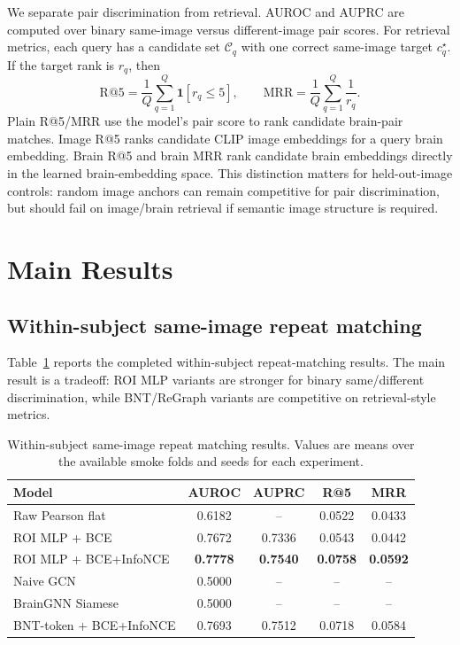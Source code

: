 \documentclass{article}
\begin{document}
We separate pair discrimination from retrieval. AUROC and AUPRC are computed over binary same-image versus different-image pair scores. For retrieval metrics, each query has a candidate set $\mathcal{C}_q$ with one correct same-image target $c_q^\star$. If the target rank is $r_q$, then
\begin{equation}
  \mathrm{R@5}=\frac{1}{Q}\sum_{q=1}^{Q}\mathbf{1}[r_q\leq5],
  \qquad
  \mathrm{MRR}=\frac{1}{Q}\sum_{q=1}^{Q}\frac{1}{r_q}.
\end{equation}
Plain R@5/MRR use the model's pair score to rank candidate brain-pair matches. Image R@5 ranks candidate CLIP image embeddings for a query brain embedding. Brain R@5 and brain MRR rank candidate brain embeddings directly in the learned brain-embedding space. This distinction matters for held-out-image controls: random image anchors can remain competitive for pair discrimination, but should fail on image/brain retrieval if semantic image structure is required.

\section{Main Results}

\subsection{Within-subject same-image repeat matching}

Table~\ref{tab:within_subject} reports the completed within-subject repeat-matching results. The main result is a tradeoff: ROI MLP variants are stronger for binary same/different discrimination, while BNT/ReGraph variants are competitive on retrieval-style metrics.

\begin{table}[!htbp]
  \centering
  \caption{Within-subject same-image repeat matching results. Values are means over the available smoke folds and seeds for each experiment.}
  \label{tab:within_subject}
  \small
  \begin{tabular}{lcccc}
    \toprule
    Model & AUROC & AUPRC & R@5 & MRR \\
    \midrule
    Raw Pearson flat & 0.6182 & -- & 0.0522 & 0.0433 \\
    ROI MLP + BCE & 0.7672 & 0.7336 & 0.0543 & 0.0442 \\
    ROI MLP + BCE+InfoNCE & \textbf{0.7778} & \textbf{0.7540} & \textbf{0.0758} & \textbf{0.0592} \\
    Naive GCN & 0.5000 & -- & -- & -- \\
    BrainGNN Siamese & 0.5000 & -- & -- & -- \\
    BNT-token + BCE+InfoNCE & 0.7693 & 0.7512 & 0.0718 & 0.0584 \\
    \bottomrule
  \end{tabular}
\end{table}
\end{document}
